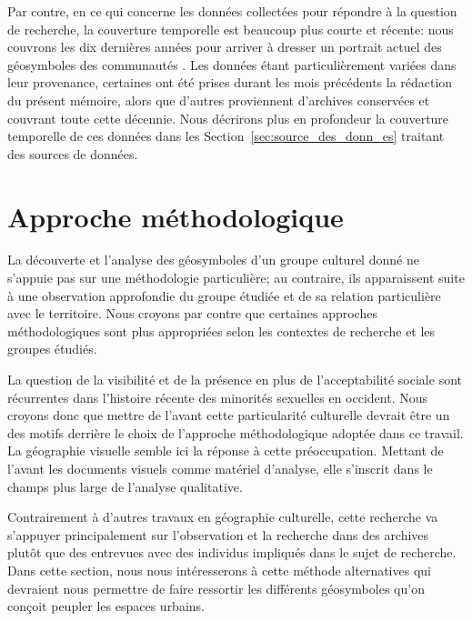 Par contre, en ce qui concerne les données collectées pour répondre à la question de recherche, la couverture temporelle est beaucoup plus courte et récente: nous couvrons les dix dernières années pour arriver à dresser un portrait actuel des géosymboles des communautés \lgbt{}. 
Les données étant particulièrement variées dans leur provenance, certaines ont été prises durant les mois précédents la rédaction du présent mémoire, alors que d'autres proviennent d'archives conservées et couvrant toute cette décennie. 
Nous décrirons plus en profondeur la couverture temporelle de ces données dans les Section~\ref{sec:source_des_donn_es} traitant des sources de données.

\section{Approche méthodologique}
\label{sec:approche_m_thodologique}
La découverte et l'analyse des géosymboles d'un groupe culturel donné ne s'appuie pas sur une méthodologie particulière; au contraire, ils apparaissent suite à une observation approfondie du groupe étudiée et de sa relation particulière avec le territoire. 
Nous croyons par contre que certaines approches méthodologiques sont plus appropriées selon les contextes de recherche et les groupes étudiés.

La question de la visibilité et de la présence en plus de l'acceptabilité sociale sont récurrentes dans l'histoire récente des minorités sexuelles en occident. 
Nous croyons donc que mettre de l'avant cette particularité culturelle devrait être un des motifs derrière le choix de l'approche méthodologique adoptée dans ce travail. 
La géographie visuelle semble ici la réponse à cette préoccupation. 
Mettant de l'avant les documents visuels comme matériel d'analyse, elle s'inscrit dans le champs plus large de l'analyse qualitative.

Contrairement à d'autres travaux en géographie culturelle, cette recherche va s'appuyer principalement sur l'observation et la recherche dans des archives plutôt que des entrevues avec des individus impliqués dans le sujet de recherche. 
Dans cette section, nous nous intéresserons à cette méthode alternatives qui devraient nous permettre de faire ressortir les différents géosymboles qu'on conçoit peupler les espaces urbains.

